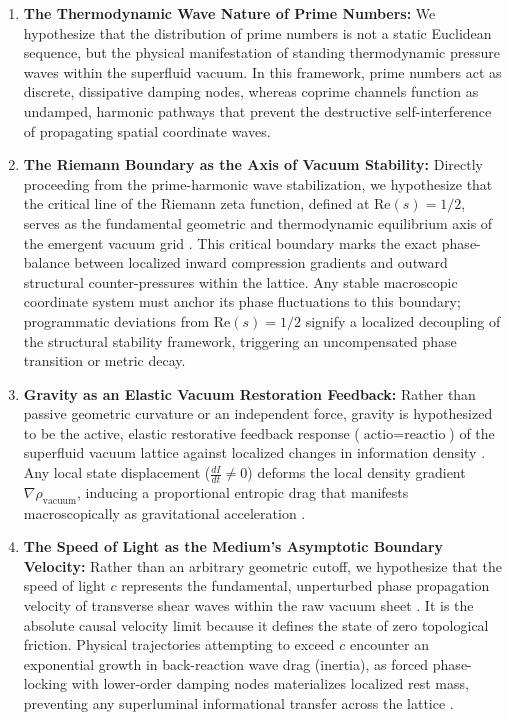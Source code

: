 \documentclass[11pt,a4paper]{article}
\theoremstyle{plain}
\theoremstyle{definition}
\theoremstyle{remark}
\begin{document}
\begin{enumerate}
    \setlength{\itemsep}{12pt}
    \setlength{\parsep}{4pt}
    
    \item \textbf{The Thermodynamic Wave Nature of Prime Numbers:} 
    We hypothesize that the distribution of prime numbers is not a static Euclidean sequence, but the physical manifestation of standing thermodynamic pressure waves within the superfluid vacuum. In this framework, prime numbers act as discrete, dissipative damping nodes, whereas coprime channels function as undamped, harmonic pathways that prevent the destructive self-interference of propagating spatial coordinate waves.
    
    \item \textbf{The Riemann Boundary as the Axis of Vacuum Stability:} 
    Directly proceeding from the prime-harmonic wave stabilization, we hypothesize that the critical line of the Riemann zeta function, defined at $\text{Re}(s) = 1/2$, serves as the fundamental geometric and thermodynamic equilibrium axis of the emergent vacuum grid \cite{riemann1857}. This critical boundary marks the exact phase-balance between localized inward compression gradients and outward structural counter-pressures within the lattice. Any stable macroscopic coordinate system must anchor its phase fluctuations to this boundary; programmatic deviations from $\text{Re}(s) = 1/2$ signify a localized decoupling of the structural stability framework, triggering an uncompensated phase transition or metric decay.

    \item \textbf{Gravity as an Elastic Vacuum Restoration Feedback:} 
    Rather than passive geometric curvature or an independent force, gravity is hypothesized to be the active, elastic restorative feedback response ($\text{actio} = \text{reactio}$) of the superfluid vacuum lattice against localized changes in information density \cite{einstein1917}. Any local state displacement ($\frac{dI}{dt} \neq 0$) deforms the local density gradient $\nabla\rho_{\text{vacuum}}$, inducing a proportional entropic drag that manifests macroscopically as gravitational acceleration \cite{verlinde2011, landauer1961}.
    
    \item \textbf{The Speed of Light as the Medium's Asymptotic Boundary Velocity:} 
    Rather than an arbitrary geometric cutoff, we hypothesize that the speed of light $c$ represents the fundamental, unperturbed phase propagation velocity of transverse shear waves within the raw vacuum sheet \cite{volovik2003}. It is the absolute causal velocity limit because it defines the state of zero topological friction. Physical trajectories attempting to exceed $c$ encounter an exponential growth in back-reaction wave drag (inertia), as forced phase-locking with lower-order damping nodes materializes localized rest mass, preventing any superluminal informational transfer across the lattice \cite{volovik2003}.
 

\end{enumerate}
\end{document}
